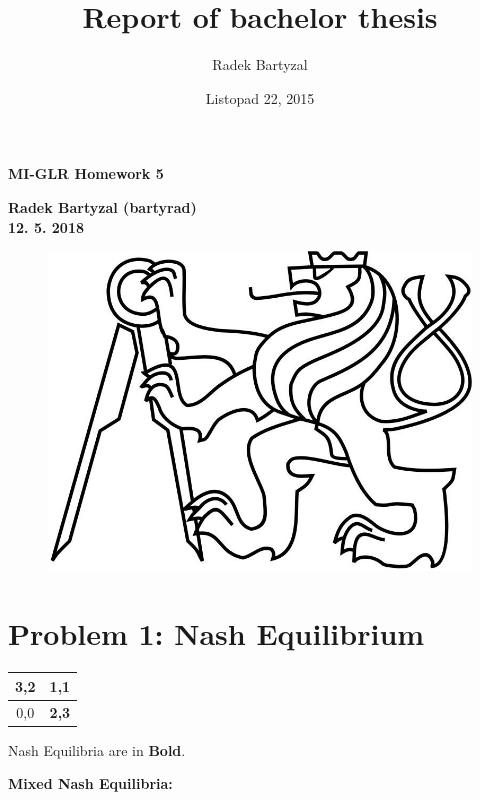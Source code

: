 \documentclass[12pt, titlepage]{article}
\title{Report of bachelor thesis}
\date{Listopad 22, 2015}
\author{Radek Bartyzal}
\begin{document}
\begin{titlepage}
    \centering

        
    {\bfseries\huge 
    MI-GLR Homework 5\\}
    \smallskip
\smallskip
\smallskip
  
    \vskip1cm
        
    {\bfseries\large 
    Radek Bartyzal (bartyrad)\\
    }    
    \vskip1cm
    {\bfseries\large 
    12. 5. 2018 \\
    }
    \vfill
    \begin{figure}[h!]
    \centering
    \includegraphics[scale=0.20]{logo}
    \end{figure}

    
    \vfill
\end{titlepage}

\section{Problem 1: Nash Equilibrium}
\begin{center}
\begin{tabular}[c]{|c|c|}
\hline 
\textbf{3,2} & 1,1 \\ 
\hline 
0,0 & \textbf{2,3} \\ 
\hline 
\end{tabular} 
\end{center} 

Nash Equilibria are in \textbf{Bold}.
\vskip1cm

\textbf{Mixed Nash Equilibria:}
\end{document}
